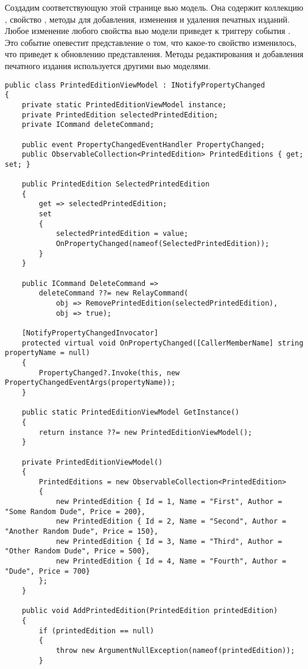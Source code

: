 \documentclass[a4paper,14pt]{extarticle}
\begin{document}
Создадим соответствующую этой странице вью модель. Она содержит коллекцию ,
свойство , методы для добавления, изменения и удаления печатных изданий.
Любое изменение любого свойства вью модели приведет к триггеру события .
Это событие опевестит представление о том, что какое-то свойство изменилось, что приведет к
обновлению представления. Методы редактирования и добавления печатного издания используется другими
вью моделями.
\begin{lstlisting}
public class PrintedEditionViewModel : INotifyPropertyChanged
{
    private static PrintedEditionViewModel instance;
    private PrintedEdition selectedPrintedEdition;
    private ICommand deleteCommand;

    public event PropertyChangedEventHandler PropertyChanged;
    public ObservableCollection<PrintedEdition> PrintedEditions { get; set; }

    public PrintedEdition SelectedPrintedEdition
    {
        get => selectedPrintedEdition;
        set
        {
            selectedPrintedEdition = value;
            OnPropertyChanged(nameof(SelectedPrintedEdition));
        }
    }

    public ICommand DeleteCommand =>
        deleteCommand ??= new RelayCommand(
            obj => RemovePrintedEdition(selectedPrintedEdition),
            obj => true);

    [NotifyPropertyChangedInvocator]
    protected virtual void OnPropertyChanged([CallerMemberName] string propertyName = null)
    {
        PropertyChanged?.Invoke(this, new PropertyChangedEventArgs(propertyName));
    }

    public static PrintedEditionViewModel GetInstance()
    {
        return instance ??= new PrintedEditionViewModel();
    }

    private PrintedEditionViewModel()
    {
        PrintedEditions = new ObservableCollection<PrintedEdition>
        {
            new PrintedEdition { Id = 1, Name = "First", Author = "Some Random Dude", Price = 200},
            new PrintedEdition { Id = 2, Name = "Second", Author = "Another Random Dude", Price = 150},
            new PrintedEdition { Id = 3, Name = "Third", Author = "Other Random Dude", Price = 500},
            new PrintedEdition { Id = 4, Name = "Fourth", Author = "Dude", Price = 700}
        };
    }

    public void AddPrintedEdition(PrintedEdition printedEdition)
    {
        if (printedEdition == null)
        {
            throw new ArgumentNullException(nameof(printedEdition));
        }


\end{lstlisting}
\end{document}
